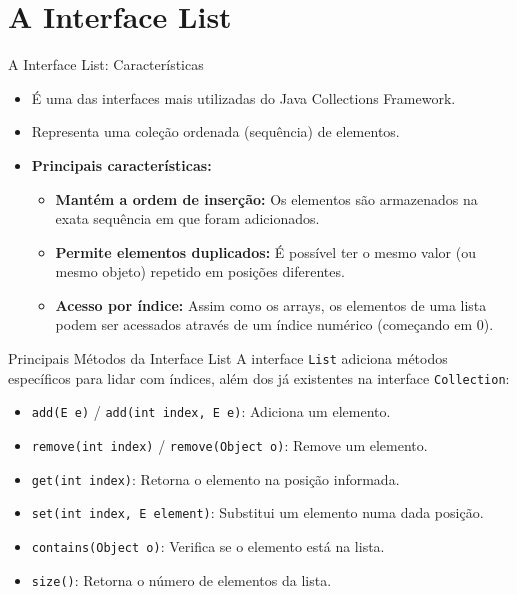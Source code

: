 \documentclass[9pt]{beamer}
\begin{document}
\section{A Interface List}

\begin{frame}{A Interface List: Características}
    \begin{itemize}
        \item É uma das interfaces mais utilizadas do Java Collections Framework.
        \item Representa uma coleção ordenada (sequência) de elementos.
        \item \textbf{Principais características:}
        \begin{itemize}
            \item \textbf{Mantém a ordem de inserção:} Os elementos são armazenados na exata sequência em que foram adicionados.
            \item \textbf{Permite elementos duplicados:} É possível ter o mesmo valor (ou mesmo objeto) repetido em posições diferentes.
            \item \textbf{Acesso por índice:} Assim como os arrays, os elementos de uma lista podem ser acessados através de um índice numérico (começando em 0).
        \end{itemize}
    \end{itemize}
\end{frame}

\begin{frame}[fragile]{Principais Métodos da Interface List}
    A interface \texttt{List} adiciona métodos específicos para lidar com índices, além dos já existentes na interface \texttt{Collection}:
    \begin{itemize}
        \item \texttt{add(E e)} / \texttt{add(int index, E e)}: Adiciona um elemento.
        \item \texttt{remove(int index)} / \texttt{remove(Object o)}: Remove um elemento.
        \item \texttt{get(int index)}: Retorna o elemento na posição informada.
        \item \texttt{set(int index, E element)}: Substitui um elemento numa dada posição.
        \item \texttt{contains(Object o)}: Verifica se o elemento está na lista.
        \item \texttt{size()}: Retorna o número de elementos da lista.
    \end{itemize}
\end{frame}
\end{document}
